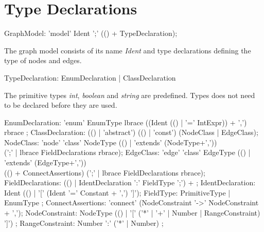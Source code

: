 \section{Type Declarations}
\begin{rail}
  GraphModel: 'model' Ident ';' (() + TypeDeclaration);
\end{rail}
The graph model consists of its name \emph{Ident} and type declarations defining the type of nodes and edges.

\begin{rail}
  TypeDeclaration: EnumDeclaration | ClassDeclaration
\end{rail}
The primitive types \emph{int}, \emph{boolean} and \emph{string} are predefined. Types does not need to be declared before they are used.

\begin{rail}
  EnumDeclaration: 'enum' EnumType lbrace ((Ident (() | '=' IntExpr)) + ',') rbrace ;
  ClassDeclaration: (() | 'abstract') (() | 'const') (NodeClass | EdgeClass);
  NodeClass: 'node' 'class' NodeType (() | 'extends' (NodeType+',')) \\ 
    (';' | lbrace FieldDeclarations rbrace);
  EdgeClass: 'edge' 'class' EdgeType (() | 'extends' (EdgeType+',')) \\
    (() + ConnectAssertions) (';' | lbrace FieldDeclarations rbrace);
  FieldDeclarations: (() | IdentDeclaration ':' FieldType ';') + ; 
  IdentDeclaration: Ident (() | '[' (Ident '=' Constant + ',') ']');
  FieldType: PrimitiveType | EnumType ; 
  ConnectAssertions: 'connect' (NodeConstraint '->' NodeConstraint + ',');
  NodeConstraint: NodeType (() | '[' ('*' | '+' | Number | RangeConstraint) ']') ;
  RangeConstraint: Number ':' ('*' | Number) ;
\end{rail}

 
